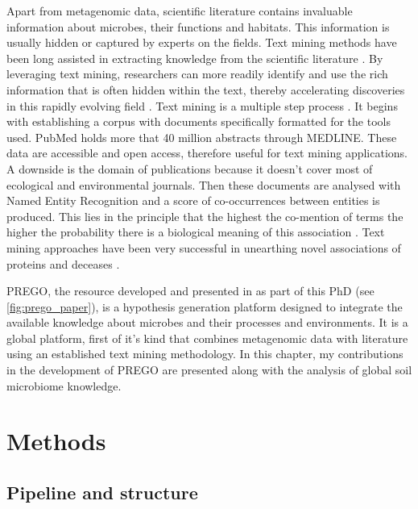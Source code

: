 Apart from metagenomic data, scientific literature contains invaluable information
about microbes, their functions and habitats. This information is usually hidden 
or captured by experts on the fields. 
Text mining methods have been long assisted in extracting knowledge from 
the scientific literature \parencite{jensen2006Literature}. 
By leveraging text mining, researchers can more readily identify and use the rich information that
is often hidden within the text, thereby accelerating discoveries in this
rapidly evolving field \parencite{badal2019Challenges}. Text mining is a multiple step
process \parencite{10.5555/1199003}. It begins with establishing a corpus with 
documents specifically formatted for the tools used. PubMed \parencite{roberts2001pubmed}
holds more that 40 million abstracts through MEDLINE. These data are accessible 
and open access, therefore useful for text mining applications. A downside is the 
domain of publications because it doesn't cover most of ecological and environmental 
journals. Then these documents are analysed with Named Entity Recognition and a 
score of co-occurrences between entities is produced. This lies in the principle 
that the highest the co-mention of terms the higher the probability there is 
a biological meaning of this association \parencite{jensen2006Literature}.
Text mining approaches have been very successful in unearthing novel 
associations of proteins and deceases \parencite{pletscher2015diseases}.

PREGO, the resource developed and presented in \textcite{microorganisms10020293}
as part of this PhD (see \ref{fig:prego_paper}), is a hypothesis generation platform designed to integrate the 
available knowledge about microbes and their processes and environments. 
It is a global platform, first of it's kind that combines metagenomic data with literature
using an established text mining methodology. 
In this chapter, my contributions in the development of PREGO are presented along with the analysis of global 
soil microbiome knowledge.

\section{Methods}
\label{sec:prego-methods}

   \subsection{Pipeline and structure}
   \label{subsec:prego-pipeline}

